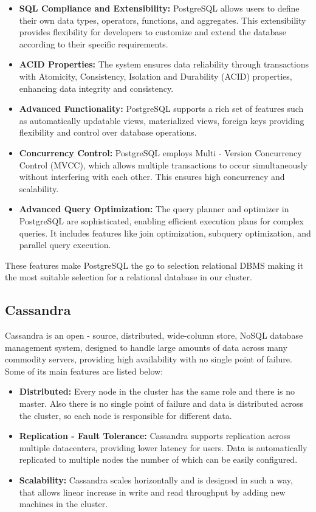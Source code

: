 \documentclass[conference]{IEEEtran}
\begin{document}
\begin{itemize}
    \item \textbf{SQL Compliance and Extensibility:} PostgreSQL allows users to define their own data types, operators, functions, and aggregates. This extensibility 
    provides flexibility for developers to customize and extend the database according to their specific requirements.
    \item \textbf{ACID Properties:} The system ensures data reliability through transactions with Atomicity, Consistency, Isolation and Durability
    (ACID) properties, enhancing data integrity and consistency.
    \item \textbf{Advanced Functionality:} PostgreSQL supports a rich set of features such as automatically updatable views, materialized views, foreign keys providing
    flexibility and control over database operations.
    \item \textbf{Concurrency Control:} PostgreSQL employs Multi - Version Concurrency Control (MVCC), which allows multiple transactions to occur simultaneously without interfering with each other. This ensures high concurrency and scalability.
    \item \textbf{Advanced Query Optimization:} The query planner and optimizer in PostgreSQL are sophisticated, enabling efficient execution plans for complex queries. 
    It includes features like join optimization, subquery optimization, and parallel query execution.
\end{itemize}

These features make PostgreSQL the go to selection relational DBMS making it the most suitable selection for a relational database in our cluster.

\subsection{Cassandra}

Cassandra is an open - source, distributed, wide-column store, NoSQL database management system, designed to handle large amounts of data across many commodity servers,
providing high availability with no single point of failure. Some of its main features are listed below:

\begin{itemize}
    \item \textbf{Distributed:} Every node in the cluster has the same role and there is no master. Also there is no single point of failure and data is distributed across the cluster, so 
    each node is responsible for different data.
    \item \textbf{Replication - Fault Tolerance:} Cassandra supports replication across multiple datacenters, providing lower latency for users. Data is automatically replicated to multiple nodes the number
    of which can be easily configured.
    \item \textbf{Scalability:} Cassandra scales horizontally and is designed in such a way, that allows linear increase in write and read throughput by adding new machines in the cluster.
\end{itemize}
\end{document}
